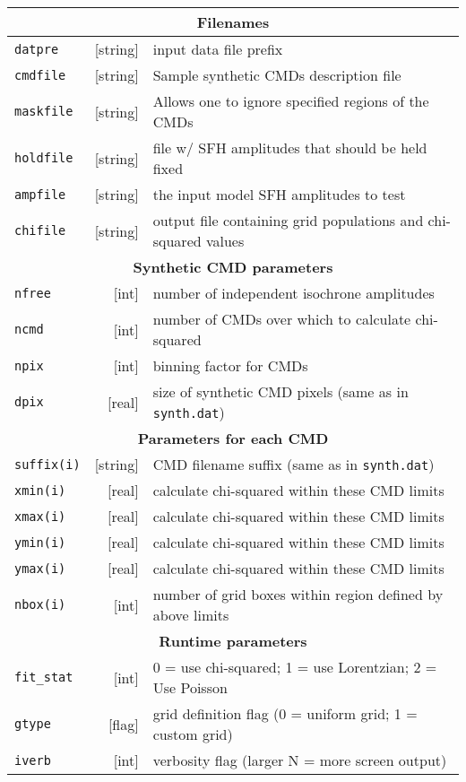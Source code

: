 \documentclass[12pt]{book}
\def\ttg{\tt\color{DarkGreen}}
\def\tto{\tt\color{myOrange}}
\begin{document}
\medskip
\noindent
{\scriptsize
\begin{tabular}{|lr|l|} 
\hline
\multicolumn{3}{|c|}{\bf Filenames} \\ 
\hline
{\tto datpre}   &[string]& input data file prefix\\ 
{\tto cmdfile}  &[string]& Sample synthetic CMDs description file\\
{\tto maskfile} &[string]& Allows one to ignore specified regions of the CMDs\\
{\tto holdfile} &[string]& file w/ SFH amplitudes that should be held fixed\\
{\tto ampfile}  &[string]& the input model SFH amplitudes to test\\
{\tto chifile}  &[string]& output file containing grid populations and chi-squared values\\
\hline
\multicolumn{3}{|c|}{\bf Synthetic CMD parameters} \\ 
\hline
{\tto nfree}  &[int]& number of independent isochrone amplitudes\\
{\tto ncmd}   &[int]& number of CMDs over which to calculate chi-squared\\
{\tto npix}   &[int]& binning factor for CMDs\\
{\tto dpix}   &[real]& size of synthetic CMD pixels (same as in {\ttg synth.dat})\\
\hline
\multicolumn{3}{|c|}{\bf Parameters for each CMD} \\
\hline
{\tto suffix(i)} &[string]& CMD filename suffix (same as in {\ttg synth.dat})\\
{\tto   xmin(i)} &[real]& calculate chi-squared within these CMD limits\\
{\tto   xmax(i)} &[real]& calculate chi-squared within these CMD limits\\
{\tto   ymin(i)} &[real]& calculate chi-squared within these CMD limits\\
{\tto   ymax(i)} &[real]& calculate chi-squared within these CMD limits\\
{\tto   nbox(i)} &[int]& number of grid boxes within region defined by above limits\\ 
\hline
\multicolumn{3}{|c|}{\bf Runtime parameters} \\ 
\hline
{\tto fit\_stat} &[int]&  0 = use chi-squared; 1 = use Lorentzian; 2 = Use Poisson\\
{\tto gtype}     &[flag]&  grid definition flag (0 = uniform grid; 1 = custom grid)\\
{\tto iverb}     &[int]& verbosity flag (larger N = more screen output)\\
\hline
\end{tabular}
}
\end{document}
